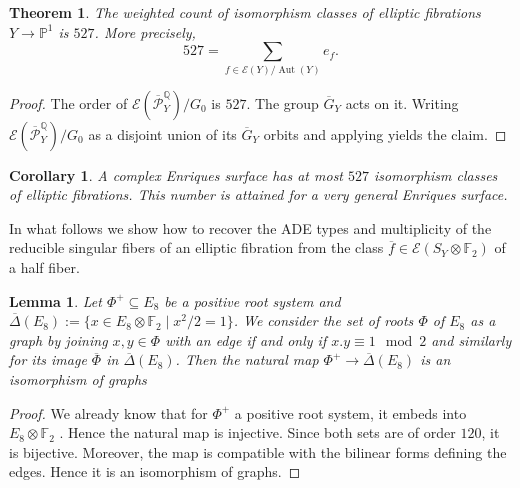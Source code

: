 \documentclass{amsart}
\theoremstyle{definition}
\theoremstyle{plain}
\newtheorem{theorem}[definition]{Theorem}
\newtheorem{lemma}[definition]{Lemma}
\newtheorem{corollary}[definition]{Corollary}
\DeclareMathOperator{\Aut}{Aut}
\newcommand{\FF}{\mathbb{F}}
\newcommand{\E}{\mathcal{E}}
\renewcommand{\P}{\mathcal{P}}
\newcommand{\Gbar}{\overline{G}}
\newcommand{\Pbar}{\overline{\P}^\mathbb{Q}}
\begin{document}
\begin{theorem}\label{thm:elliptic_fibrations}
The weighted count of isomorphism classes of elliptic fibrations $Y \to \mathbb{P}^1$ is $527$. More precisely,
\[527 = \sum_{f \in \E(Y)/\Aut(Y)} e_f.\]
\end{theorem}
\begin{proof}
 The order of $\E(\Pbar_Y)/G_0$ is $527$. The group $\Gbar_Y$ acts on it. Writing $\E(\Pbar_Y)/G_0$ as a disjoint union of
 its $\Gbar_Y$ orbits and applying  yields the claim.
\end{proof}
\begin{corollary}
 A complex Enriques surface has at most $527$ isomorphism classes of elliptic fibrations.
 This number is attained for a very general Enriques surface.
\end{corollary}

In what follows we show how to recover the ADE types and multiplicity of the reducible singular fibers
 of an elliptic fibration from the class $\overline{f} \in \E(S_Y\otimes \FF_2)$ of a half fiber.
\begin{lemma}\label{lem:injective}
Let $\Phi^+ \subseteq E_8$ be a positive root system and $\overline{\Delta}(E_8):= \{x \in E_8 \otimes \FF_2 \mid x^2/2 = 1\}$.
We consider the set of roots $\Phi$ of $E_8$ as a graph by joining $x,y \in \Phi$ with an edge if and only if $x.y \equiv 1 \mod 2$ and similarly for its image $\overline{\Phi}$ in $\overline{\Delta}(E_8)$.
Then the natural map $\Phi^+ \to \overline{\Delta}(E_8)$ is an isomorphism of graphs
\end{lemma}
\begin{proof}
We already know that for $\Phi^+$ a positive root system, it embeds into $E_{8}\otimes \FF_2$ \cite[Lemma 3.8]{brandhorst_shimada:tautaubar}. Hence the natural map is injective.
Since both sets are of order $120$, it is bijective. Moreover, the map is compatible with the bilinear forms defining the edges. Hence it is an isomorphism of graphs.
\end{proof}
\end{document}
